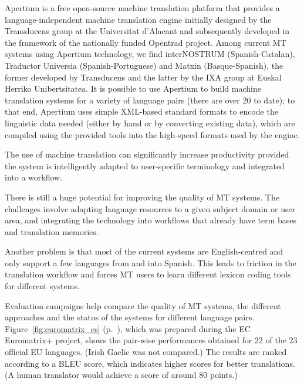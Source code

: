 \begin{multicols}{2}
Apertium is a free open-source machine translation platform that provides a language-independent machine translation engine initially designed by the Transducens group at the Universitat d'Alacant and subsequently developed in the framework of  the nationally funded Opentrad project. Among current MT systems using Apertium technology, we find interNOSTRUM (Spanish-Catalan), Traductor Universia (Spanish-Portuguese) and Matxin (Basque-Spanish), the former developed by Transducens and the latter by the IXA group  at Euskal Herriko Unibertsitatea. It is possible to use Apertium to build machine translation systems for a variety of language pairs (there are over 20 to date); to that end, Apertium uses simple XML-based standard formats to encode the linguistic data needed (either by hand or by converting existing data), which are compiled using the provided tools into the high-speed formats used by the engine.


The use of machine translation can significantly increase productivity provided the system is intelligently adapted to user-specific terminology and integrated into a workflow. 

There is still a huge potential for improving the quality of MT systems. The challenges involve adapting language resources to a given subject domain or user area, and integrating the technology into workflows that already have term bases and translation memories.

Another problem is that most of the current systems are English-centred and only support a few languages from and into Spanish. This leads to friction in the translation workflow and forces MT users to learn different lexicon coding tools for different systems.

Evaluation campaigns help compare the quality of MT systems, the different approaches and the status of the systems for different language pairs. Figure~\ref{fig:euromatrix_es} (p.~\pageref{fig:euromatrix_es}), which was prepared during the EC Euromatrix+ project, shows the pair-wise performances obtained for 22 of the 23 official EU languages. (Irish Gaelic was not compared.) The results are ranked according to a BLEU score, which indicates higher scores for better translations.\cite{bleu1} (A human translator would achieve a score of around 80 points.) 


\end{multicols}
